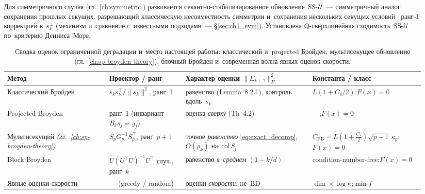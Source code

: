 Для симметричного случая (гл.~\ref{ch:symmetric}) развивается
секантно-стабилизированное обновление~SS-$\mathcal{U}$~--- симметричный
аналог сохранения прошлых секущих, разрешающий классическую
несовместность симметрии и~сохранения нескольких секущих
условий~\cite{schnabel1983} ранг-1 коррекцией в~$s_k^\perp$ (механизм
и~сравнение с~известными подходами~--- \S\ref{sec:ch1_sym}).
Установлена Q-сверхлинейная сходимость~SS-$\mathcal{U}$ по~критерию
Денниса--Море.

\begin{table}[ht]
\centering
\caption{Сводка оценок ограниченной деградации и~место настоящей работы:
классический и~projected Бройден, мультисекущее обновление
(гл.~\ref{ch:sp-broyden-theory}), блочный Бройден и~современная волна
явных оценок скорости.}\label{tab:ch1_overview}
\renewcommand{\arraystretch}{1.35}
\begin{tabular}{|@{}p{2.9cm}|p{4.0cm}|p{3.8cm}|p{4.3cm}@{}|}
\toprule
Метод & Проектор / ранг & Характер оценки $\|E_{k+1}\|_F^2$ & Константа / класс \\
\midrule
Классический Бройден~\cite{broyden1965,dennis1996}
  & $s_k s_k^\top/\|s_k\|^2$, ранг~1
  & равенство (Lemma~8.2.1), контроль вдоль~$s_k$
  & $L(1{+}C_s/2)$;\newline $F(x)=0$ \\ \hline
Projected Broyden~\cite{gay_schnabel1978}
  & ранг~1 (инвариант $B_k s_j{=}y_j$)
  & оценка \emph{сверху} (Th~4.2)
  & ---;\newline $F(x)=0$ \\ \hline
Мультисекущий \emph{(гл.~\ref{ch:sp-broyden-theory})}
  & $S_p G_p^{-1} S_p^\top$, ранг~$p{+}1$
  & точное \emph{равенство} \eqref{eq:exact_decomp}, $O(\rho_k)$ на~$\mathrm{col}\,S_p$
  & $C_{\mathrm{PB}}{=}L(1{+}\tfrac{C_s}{2})\sqrt{p{+}1}\,\kappa_p$;\newline $F(x)=0$ \\ \hline
Block Broyden~\cite{liu2023block}
  & $U(U^\top U)^{-1}U^\top$ случ., ранг~$k$
  & равенство \emph{в~среднем} $(1{-}k/d)$
  & condition-number-free;\newline $F(x)=0$ \\ \hline
Явные оценки скорости~\cite{rodomanov2021greedy,rodomanov2022rates,jin2023nonasymp,lin2022explicit}
  & --- (greedy / random)
  & оценки \emph{скорости}, не~BD
  & $\dim\times\log\kappa$;\newline $\min f$ \\
\bottomrule
\end{tabular}
\end{table}

